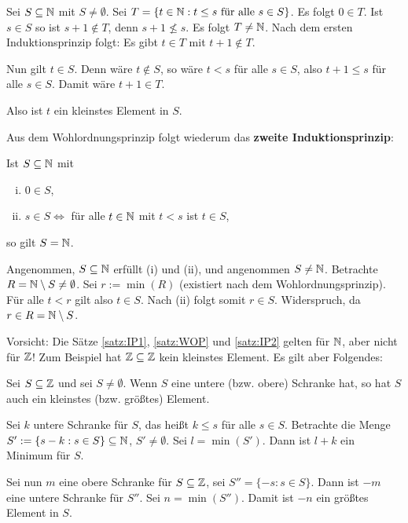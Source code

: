 	\begin{beweis}
		Sei $S \subseteq \mathbb{N}$ mit $S \neq \emptyset$.
		Sei $T = \{t \in \mathbb{N} : t \leq s \text{ für alle } s \in S\}$.
		Es folgt $0 \in T$.
		Ist $s \in S$ so ist $s+1 \notin T$, denn $s+1 \nleq s$.
		Es folgt $T \neq \mathbb{N}$.
		Nach dem ersten Induktionsprinzip folgt: Es gibt $t \in T$ mit $t+1 \notin T$.
		
		Nun gilt $t \in S$. Denn wäre $t \notin S$, so wäre $t < s$ für alle $s \in S$, also $t+1 \leq s$ für alle $s \in S$. Damit wäre $t+1 \in T$. \lightning
		
		Also ist $t$ ein kleinstes Element in $S$.
	\end{beweis}
	
	Aus dem Wohlordnungsprinzip folgt wiederum das \textbf{zweite Induktionsprinzip}:
	
	\begin{satz}
		\label{satz:IP2}
		Ist $S \subseteq \mathbb{N}$ mit
		\begin{enumerate}[(i)]
			\item $0 \in S$,
			\item $s \in S \Leftrightarrow$ für alle $t \in \mathbb{N}$ mit $t < s$ ist $t \in S$,
		\end{enumerate}
		so gilt $S = \mathbb{N}$.
	\end{satz}
	
	\begin{beweis}
		Angenommen, $S \subseteq \mathbb{N}$ erfüllt (i) und (ii), und angenommen $S \neq \mathbb{N}$.
		Betrachte $R = \mathbb{N} \setminus S \neq \emptyset$.
		Sei $r := \min(R)$ (existiert nach dem Wohlordnungsprinzip). Für alle $t < r$ gilt also $t \in S$. Nach (ii) folgt somit $r \in S$. Widerspruch, da $r \in R = \mathbb{N} \setminus S$.
	\end{beweis}

	Vorsicht: Die Sätze \ref{satz:IP1}, \ref{satz:WOP} und \ref{satz:IP2} gelten für $\mathbb{N}$, aber nicht für $\mathbb{Z}$!
	Zum Beispiel hat $\mathbb{Z} \subseteq \mathbb{Z}$ kein kleinstes Element.
	Es gilt aber Folgendes:
	
	\begin{lemma}
		\label{lemma:1.3}
		Sei $S \subseteq \mathbb{Z}$ und sei $S \neq \emptyset$. \marginnote{[3]}
		Wenn $S$ eine untere (bzw. obere) Schranke hat, so hat $S$ auch ein kleinstes (bzw. größtes) Element.
	\end{lemma}
	
	\begin{beweis}
		Sei $k$ untere Schranke für $S$, das heißt $k \leq s$ für alle $s \in S$.
		Betrachte die Menge $S' := \{s - k : s \in S\} \subseteq \mathbb{N}$, $S' \neq \emptyset$.
		Sei $l = \min(S')$.
		Dann ist $l+k$ ein Minimum für $S$.
		
		Sei nun $m$ eine obere Schranke für $S \subseteq \mathbb{Z}$, sei $S'' = \{-s : s \in S\}$.
		Dann ist $-m$ eine untere Schranke für $S''$.
		Sei $n = \min(S'')$.
		Damit ist $-n$ ein größtes Element in $S$. 
	\end{beweis}

